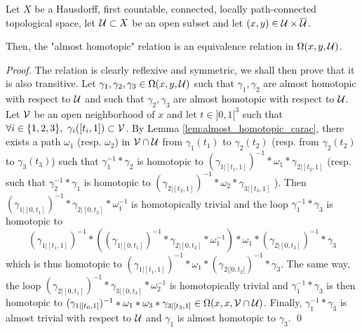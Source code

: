 \begin{lem}\label{lem:hausdorff_first_countable_connected} 
 Let $X$ be a Hausdorff, first countable, connected, locally path-connected topological space, let $\mathcal{U}\subset X$ be an open subset and let $(x,y)\in \mathcal{U}\times \overline {\mathcal{U}}$.
 
 Then, the "almost homotopic" relation is an equivalence relation in $\Omega(x,y,\mathcal{U})$.
 
\end{lem}
\begin{proof}
The relation is clearly reflexive and symmetric, we shall then prove that it is also transitive. Let $\gamma_1, \gamma_2,\gamma_3 \in \Omega(x,y,\mathcal{U})$ such that $\gamma_1,\gamma_2$ are almost homotopic with respect to $\mathcal{U}$ and such that
$\gamma_2,\gamma_3$ are almost homotopic with respect to $\mathcal{U}$. Let $\mathcal V$ be an open neighborhood of $x$ and let $t \in ]0,1[^3$ such that $\forall i\in\{1,2,3\},\ \gamma_i([t_i,1])\subset \V$. By Lemma \ref{lem:almost_homotopic_carac}, there exists a path $\omega_{1}$ (resp. $\omega_2$)  in $\mathcal V\cap \mathcal{U}$ from $\gamma_1(t_1)$ to $\gamma_2(t_2)$ (resp. from $\gamma_2(t_2)$ to $\gamma_3(t_3)$) such that $\gamma_1^{-1}*\gamma_2$ is homotopic to $(\gamma_{1|[t_1,1]})^{-1}
*\omega_1*\gamma_{2|[t_2,1]}$ (resp. such that $\gamma_2^{-1}*\gamma_1$ is homotopic to $(\gamma_{2|[t_2,1]})^{-1}*\omega_2*\gamma_{3|[t_3,1]}$ ). Then $(\gamma_{1|[0,t_1]})^{-1}*\gamma_{2|[0,t_2]}*\omega_1^{-1}$ is 
homotopically trivial and the loop
 $\gamma_{1}^{-1}*\gamma_3$ is homotopic to 
 $$(\gamma_{1|[t_1,1]})^{-1}*\left((\gamma_{1|[0,t_1]})^{-1}*\gamma_{2|[0,t_2]}*\omega_1^{-1}\right)*\omega_1*(\gamma_{2|[0,t_2]})^{-1}*\gamma_3$$ which is thus homotopic to $(\gamma_{1|[t_1,1]})^{-1}*\omega_1*(\gamma_{2|[0,t_2[})^{-1}*\gamma_3$. The same way, the loop $(\gamma_{2|[0,t_1]})^{-1}*\gamma_{3|[0,t_3]}*\omega_2^{-1}$ is homotopically trivial and $\gamma_{1}^{-1}*\gamma_3$ is then homotopic to $(\gamma_{1|[t_0,1]})^{-1}*\omega_1*\omega_3*\gamma_{3|[t_3,1]} \in \Omega(x,x,\mathcal V\cap \mathcal{U})$. 
 Finally, $\gamma_{1}^{-1}*\gamma_3$ is almost trivial with respect to $\mathcal{U}$ and $\gamma_1$ is almost homotopic to $\gamma_3$.
\qed\end{proof}

